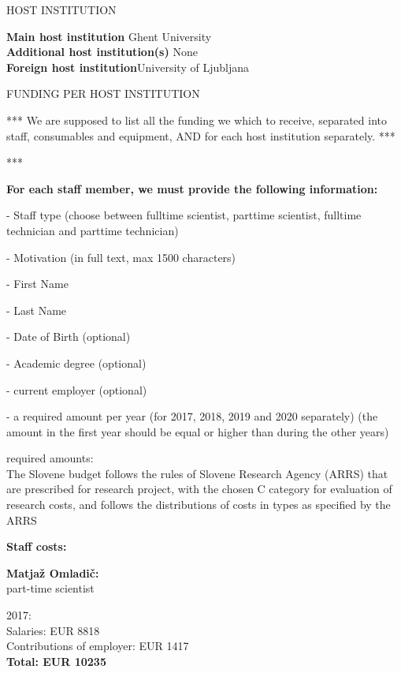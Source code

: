 \documentclass[11pt,dvipsnames,usenames,a4paper]{article}
\begin{document}
\vspace{10pt}

\begin{shaded}\centering HOST INSTITUTION \end{shaded}
\textbf{Main host institution} \tab Ghent University \\
\textbf{Additional host institution(s)} \tab None\\
\textbf{Foreign host institution}\tab University of Ljubljana \\

\begin{shaded}\centering FUNDING PER HOST INSTITUTION \end{shaded}

*** We are supposed to list all the funding we which to receive, separated into staff, consumables and equipment, AND for each host institution separately. ***

*** {\bf\color{blue}For each staff member, we must provide the following information:

- Staff type (choose between fulltime scientist, parttime scientist, fulltime technician and parttime technician)

- Motivation (in full text, max 1500 characters)

- First Name

- Last Name

- Date of Birth (optional)

- Academic degree (optional)

- current employer (optional)

- a required amount per year (for 2017, 2018, 2019 and 2020 separately) (the amount in the first year should be equal or higher than during the other years)}

required amounts:  \\

The Slovene budget follows the rules of Slovene Research Agency (ARRS) that are prescribed for research project, with the chosen C category for evaluation of research costs, and follows the distributions of costs in types as specified by the ARRS 

{\bf Staff costs:}

\textbf{Matjaž Omladič:} \\ 
part-time scientist

2017: \\
 
Salaries: EUR 8818 \\
Contributions of employer: EUR 1417 \\
{\bf Total: EUR 10235} \\
\end{document}
